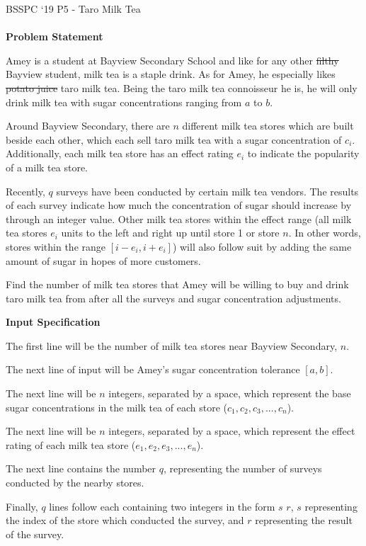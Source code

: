 \documentclass[]{article}
\begin{document}
{\Large BSSPC ‘19 P5 - Taro Milk Tea}
\\\\
\textbf{\large Problem Statement}
\par
Amey is a student at Bayview Secondary School and like for any other \sout{filthy} Bayview student, milk tea is a staple drink. As for Amey, he especially likes \sout{potato juice} taro milk tea. Being the taro milk tea connoisseur he is, he will only drink milk tea with sugar concentrations ranging from $a$ to $b$. 

\par
Around Bayview Secondary, there are $n$ different milk tea stores which are built beside each other, which each sell taro milk tea with a sugar concentration of $c_i$. Additionally, each milk tea store has an effect rating $e_i$ to indicate the popularity of a milk tea store. 

\par
Recently, $q$ surveys have been conducted by certain milk tea vendors. The results of each survey indicate how much the concentration of sugar should increase by through an integer value. Other milk tea stores within the effect range (all milk tea stores $e_i$ units to the left and right up until store 1 or store $n$. In other words, stores within the range $[i - e_i, i + e_i]$) will also follow suit by adding the same amount of sugar in hopes of more customers. 

\par
Find the number of milk tea stores that Amey will be willing to buy and drink taro milk tea from after all the surveys and sugar concentration adjustments. 

\textbf{\large Input Specification}
\par
The first line will be the number of milk tea stores near Bayview Secondary, $n$.
\par
The next line of input will be Amey’s sugar concentration tolerance $[a,b]$.
\par
The next line will be $n$ integers, separated by a space, which represent the base sugar concentrations in the milk tea of each store ($c_1, c_2, c_3, ...,c_n$). 
\par
The next line will be $n$ integers, separated by a space, which represent the effect rating of each milk tea store ($e_1, e_2 , e_3, ..., e_n$). 
\par
The next line contains the number $q$, representing the number of surveys conducted by the nearby stores.
\par 
Finally, $q$ lines follow each containing two integers in the form $s$ $r$, $s$ representing the index of the store which conducted the survey, and $r$ representing the result of the survey.
\end{document}
